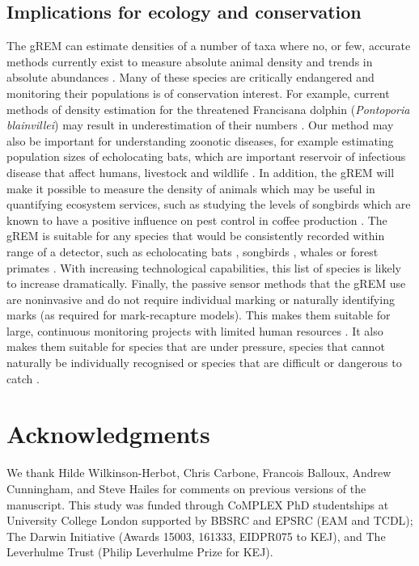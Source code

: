 \documentclass[a4paper,10pt,reqno,oneside]{amsart}
\begin{document}
\subsection*{Implications for ecology and conservation}
The gREM can estimate densities of a number of taxa where no, or few, accurate methods currently exist to measure absolute animal density and trends in absolute abundances \citep{thomas2012passive}. Many of these species are critically endangered and monitoring their populations is of conservation interest. For example, current methods of density estimation for the threatened Francisana dolphin (\emph{Pontoporia blainvillei}) may result in underestimation of their numbers \citep{crespo2010abundance}. Our method may also be important for understanding zoonotic diseases, for example estimating population sizes of echolocating bats, which are important reservoir of infectious disease that affect humans, livestock and wildlife \citep{calisher2006bats}. In addition, the gREM will make it possible to measure the density of animals which may be useful in quantifying ecosystem services, such as studying the levels of songbirds which are known to have a positive influence on pest control in coffee production \citep{jirinec2011roosting}. The gREM is suitable for any species that would be consistently recorded within range of a detector, such as echolocating bats \citep{kunz2009methods}, songbirds \citep{buckland2006point}, whales \citep{marques2009estimating} or forest primates \citep{hassel2008reliable}. With increasing technological capabilities, this list of species is likely to increase dramatically. Finally, the passive sensor methods that the gREM use are noninvasive and do not require individual marking \citep{jewell2013effect} or naturally identifying marks (as required for mark-recapture models). This makes them suitable for large, continuous monitoring projects with limited human resources \citep{kelly2012noninvasive}. It also makes them suitable for species that are under pressure, species that cannot naturally be individually recognised or species that are difficult or dangerous to catch \citep{thomas2012passive}.


\section*{Acknowledgments}
We thank Hilde Wilkinson-Herbot, Chris Carbone, Francois Balloux, Andrew Cunningham, and Steve Hailes for comments on previous versions of the manuscript. This study was funded through CoMPLEX PhD studentships at University College London supported by BBSRC and EPSRC (EAM and TCDL); The Darwin Initiative (Awards 15003, 161333, EIDPR075 to KEJ), and The Leverhulme Trust (Philip Leverhulme Prize for KEJ).

	
	
\end{document}
